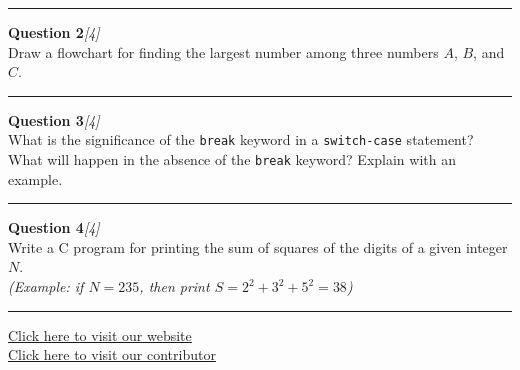 \documentclass[11pt,a4paper]{article}
\newcommand{\pts}[1]{\hfill   \textit{[#1]}}
\begin{document}
\medskip\rule{\linewidth}{0.2pt}\medskip




\noindent   \textbf{Question 2}\pts{4} \\
Draw a flowchart for finding the largest number among three numbers $A$, $B$, and $C$.

\medskip\rule{\linewidth}{0.2pt}\medskip




\noindent   \textbf{Question 3}\pts{4} \\
What is the significance of the   \texttt{break} keyword in a   \texttt{switch-case} statement? What will happen in the absence of the   \texttt{break} keyword? Explain with an example.

\medskip\rule{\linewidth}{0.2pt}\medskip




\noindent   \textbf{Question 4}\pts{4} \\
Write a C program for printing the sum of squares of the digits of a given integer $N$.\\
   \textit{(Example: if $N = 235$, then print $S = 2^2 + 3^2 + 5^2 = 38$)}

\vfill\rule{\linewidth}{0.4pt}

\begin{center}\small
\href{https://bhu-exam.vercel.app/}{Click here to visit our website}\\[4pt]
\href{https://me-aryan.vercel.app/}{Click here to visit our contributor}
\end{center}
\end{document}
